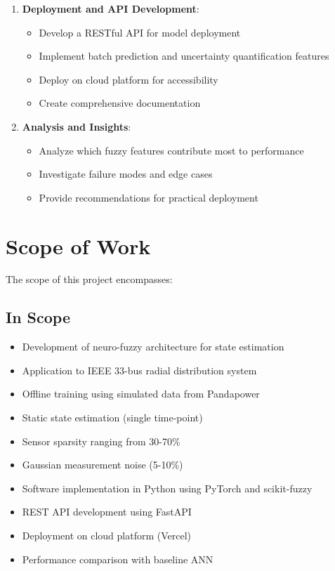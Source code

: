 \documentclass[12pt,a4paper]{report}
\begin{document}
\begin{enumerate}
    \item \textbf{Deployment and API Development}:
    \begin{itemize}
        \item Develop a RESTful API for model deployment
        \item Implement batch prediction and uncertainty quantification features
        \item Deploy on cloud platform for accessibility
        \item Create comprehensive documentation
    \end{itemize}
    
    \item \textbf{Analysis and Insights}:
    \begin{itemize}
        \item Analyze which fuzzy features contribute most to performance
        \item Investigate failure modes and edge cases
        \item Provide recommendations for practical deployment
    \end{itemize}
\end{enumerate}

\section{Scope of Work}

The scope of this project encompasses:

\subsection{In Scope}

\begin{itemize}
    \item Development of neuro-fuzzy architecture for state estimation
    \item Application to IEEE 33-bus radial distribution system
    \item Offline training using simulated data from Pandapower
    \item Static state estimation (single time-point)
    \item Sensor sparsity ranging from 30-70\%
    \item Gaussian measurement noise (5-10\%)
    \item Software implementation in Python using PyTorch and scikit-fuzzy
    \item REST API development using FastAPI
    \item Deployment on cloud platform (Vercel)
    \item Performance comparison with baseline ANN
\end{itemize}
\end{document}
